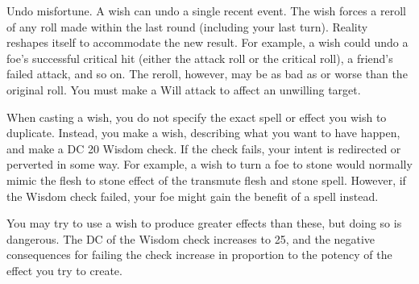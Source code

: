 \begin{spelleffect}
\begin{itemize*}
        \item Undo misfortune. A wish can undo a single recent event. The wish forces a reroll of any roll made within the last round (including your last turn). Reality reshapes itself to accommodate the new result. For example, a wish could undo a foe's successful critical hit (either the attack roll or the critical roll), a friend's failed attack, and so on. The reroll, however, may be as bad as or worse than the original roll. You must make a Will attack to affect an unwilling target.
    \end{itemize*}
    \par When casting a wish, you do not specify the exact spell or effect you wish to duplicate. Instead, you make a wish, describing what you want to have happen, and make a DC 20 Wisdom check. If the check fails, your intent is redirected or perverted in some way. For example, a wish to turn a foe to stone would normally mimic the flesh to stone effect of the transmute flesh and stone spell. However, if the Wisdom check failed, your foe might gain the benefit of a  spell instead.
    \par You may try to use a wish to produce greater effects than these, but doing so is dangerous. The DC of the Wisdom check increases to 25, and the negative consequences for failing the check increase in proportion to the potency of the effect you try to create.
\end{spelleffect}

